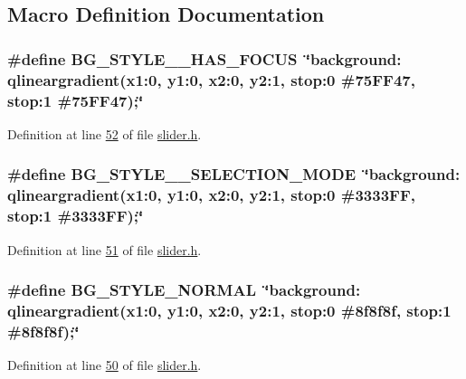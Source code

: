 \subsection{Macro Definition Documentation}
\hypertarget{a00078_a3b78c22b908aee9d7cda0ff6240570fd}{
\subsubsection[{B\+G\+\_\+\+S\+T\+Y\+L\+E\+\_\+\+\_\+\+H\+A\+S\+\_\+\+F\+O\+C\+U\+S}]{\setlength{\rightskip}{0pt plus 5cm}\#define B\+G\+\_\+\+S\+T\+Y\+L\+E\+\_\+\+\_\+\+H\+A\+S\+\_\+\+F\+O\+C\+U\+S~\char`\"{}background\+: qlineargradient(x1\+:0, y1\+:0, x2\+:0, y2\+:1, stop\+:0 \#75\+F\+F47, stop\+:1 \#75\+F\+F47);\char`\"{}}}\label{a00078_a3b78c22b908aee9d7cda0ff6240570fd}


Definition at line \hyperlink{a00078_source_l00052}{52} of file \hyperlink{a00078_source}{slider.\+h}.

\hypertarget{a00078_a0d978e946366d0eb299bb966cf8a52e9}{
\subsubsection[{B\+G\+\_\+\+S\+T\+Y\+L\+E\+\_\+\+\_\+\+S\+E\+L\+E\+C\+T\+I\+O\+N\+\_\+\+M\+O\+D\+E}]{\setlength{\rightskip}{0pt plus 5cm}\#define B\+G\+\_\+\+S\+T\+Y\+L\+E\+\_\+\+\_\+\+S\+E\+L\+E\+C\+T\+I\+O\+N\+\_\+\+M\+O\+D\+E~\char`\"{}background\+: qlineargradient(x1\+:0, y1\+:0, x2\+:0, y2\+:1, stop\+:0 \#3333\+F\+F, stop\+:1 \#3333\+F\+F);\char`\"{}}}\label{a00078_a0d978e946366d0eb299bb966cf8a52e9}


Definition at line \hyperlink{a00078_source_l00051}{51} of file \hyperlink{a00078_source}{slider.\+h}.

\hypertarget{a00078_a0a9d6eabafd981a8b48b343249428077}{
\subsubsection[{B\+G\+\_\+\+S\+T\+Y\+L\+E\+\_\+\+N\+O\+R\+M\+A\+L}]{\setlength{\rightskip}{0pt plus 5cm}\#define B\+G\+\_\+\+S\+T\+Y\+L\+E\+\_\+\+N\+O\+R\+M\+A\+L~\char`\"{}background\+: qlineargradient(x1\+:0, y1\+:0, x2\+:0, y2\+:1, stop\+:0 \#8f8f8f, stop\+:1 \#8f8f8f);\char`\"{}}}\label{a00078_a0a9d6eabafd981a8b48b343249428077}


Definition at line \hyperlink{a00078_source_l00050}{50} of file \hyperlink{a00078_source}{slider.\+h}.

